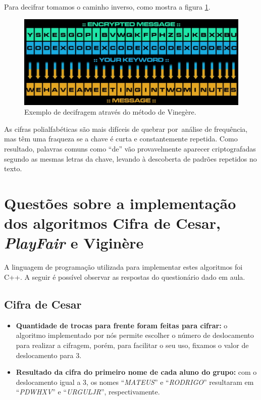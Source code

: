 \documentclass[
article,			%
11pt,				%
oneside,			%
a4paper,			%
english,			%
brazil,				%
sumario=tradicional
]{abntex2}
\begin{document}
			Para decifrar tomamos o caminho inverso, como mostra a figura \ref{fig:vinegere3}.
			
			\begin{figure} [h!]
				\centering
				\includegraphics[width=0.7\linewidth]{Imagens/vinegere3.png}
				\caption{Exemplo de decifragem através do método de Vinegère.}
				\label{fig:vinegere3}
			\end{figure}
			
			As cifras polialfabéticas são mais difíceis de quebrar por análise de frequência, mas têm uma fraqueza se a chave é curta e constantemente repetida. Como resultado, palavras comuns como ``de'' vão provavelmente aparecer criptografadas segundo as mesmas letras da chave, levando à descoberta de padrões repetidos no texto.

	\section{Questões sobre a implementação dos algoritmos Cifra de Cesar, \textit{PlayFair} e Viginère}
	
		A linguagem de programação utilizada para implementar estes algoritmos foi C++. A seguir é possível observar as respostas do questionário dado em aula.
		
		\subsection{Cifra de Cesar}
			\begin{itemize}
				\item \textbf{Quantidade de trocas para frente foram feitas para cifrar:} o algoritmo implementado por nós permite escolher o número de deslocamento para realizar a cifragem, porém, para facilitar o seu uso, fixamos o valor de deslocamento para $3$.
				\item \textbf{Resultado da cifra do primeiro nome de cada aluno do grupo:} com o deslocamento igual a $3$, os nomes ``\textit{MATEUS}'' e ``\textit{RODRIGO}'' resultaram em ``\textit{PDWHXV}'' e ``\textit{URGULJR}'', respectivamente.
			\end{itemize}
\end{document}
